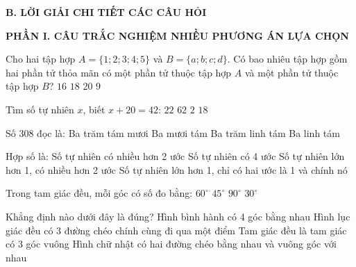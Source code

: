 \documentclass[12pt,a4paper]{article}
\begin{document}
\noindent\textbf{\large B. LỜI GIẢI CHI TIẾT CÁC CÂU HỎI}
\vspace{2mm}

\noindent\textbf{\large PHẦN I. CÂU TRẮC NGHIỆM NHIỀU PHƯƠNG ÁN LỰA CHỌN}
\vspace{1mm}
\begin{ex}
Cho hai tập hợp $A = \{1; 2; 3; 4; 5\}$ và $B = \{a; b; c; d\}$. Có bao nhiêu tập hợp gồm hai phần tử thỏa mãn có một phần tử thuộc tập hợp $A$ và một phần tử thuộc tập hợp $B$?
\choice
{$16$}
{$18$}
{\True $20$}
{$9$}
\end{ex}

\begin{ex}
Tìm số tự nhiên $x$, biết $x + 20 = 42$:
\choice
{\True $22$}
{$62$}
{$2$}
{$18$}
\end{ex}

\begin{ex}
Số $308$ đọc là:
\choice
{Ba trăm tám mươi}
{Ba mươi tám}
{\True Ba trăm linh tám}
{Ba linh tám}
\end{ex}

\begin{ex}
Hợp số là:
\choice
{Số tự nhiên có nhiều hơn 2 ước}
{Số tự nhiên có 4 ước}
{\True Số tự nhiên lớn hơn 1, có nhiều hơn 2 ước}
{Số tự nhiên lớn hơn 1, chỉ có hai ước là 1 và chính nó}
\end{ex}

\begin{ex}
Trong tam giác đều, mỗi góc có số đo bằng:
\choice
{\True $60^\circ$}
{$45^\circ$}
{$90^\circ$}
{$30^\circ$}
\end{ex}

\begin{ex}
Khẳng định nào dưới đây là đúng?
\choice
{Hình bình hành có 4 góc bằng nhau}
{\True Hình lục giác đều có 3 đường chéo chính cùng đi qua một điểm}
{Tam giác đều là tam giác có 3 góc vuông}
{Hình chữ nhật có hai đường chéo bằng nhau và vuông góc với nhau}
\end{ex}
\end{document}
